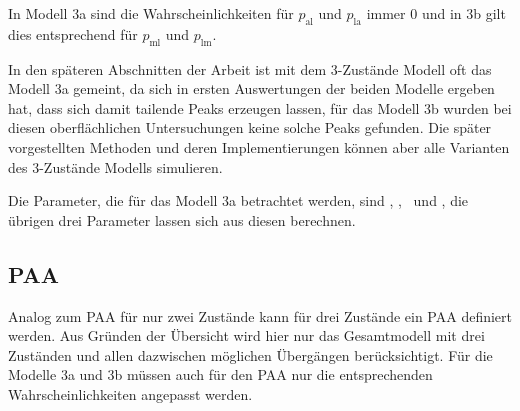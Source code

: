 In Modell 3a sind die Wahrscheinlichkeiten für $p_{\text{al}}$ und $p_{\text{la}}$ immer $0$ und in 3b gilt dies entsprechend für $p_{\text{ml}}$ und $p_{\text{lm}}$.

In den späteren Abschnitten der Arbeit ist mit dem 3-Zustände Modell oft das Modell 3a gemeint, da sich in ersten Auswertungen der beiden Modelle ergeben hat, dass sich damit tailende Peaks erzeugen lassen, für das Modell 3b wurden bei diesen oberflächlichen Untersuchungen keine solche Peaks gefunden. Die später vorgestellten Methoden und deren Implementierungen können aber alle Varianten des 3-Zustände Modells simulieren.

Die Parameter, die für das Modell 3a betrachtet werden, sind \pmm, \pml, \paa\ und \pll, die übrigen drei Parameter lassen sich aus diesen berechnen.


\subsection{PAA}
Analog zum PAA für nur zwei Zustände kann für drei Zustände ein PAA definiert werden. Aus Gründen der Übersicht wird hier nur das Gesamtmodell mit drei Zuständen und allen dazwischen möglichen Übergängen berücksichtigt. Für die Modelle 3a und 3b müssen auch für den PAA nur die entsprechenden Wahrscheinlichkeiten angepasst werden.

